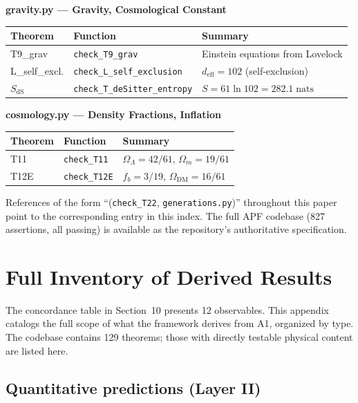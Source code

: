 \documentclass[11pt]{article}
\newcommand{\nats}{\;\mathrm{nats}}
\begin{document}
\medskip
\noindent\textbf{gravity.py --- Gravity, Cosmological Constant}

\smallskip
\begin{center}
\small
\begin{tabular}{lll}
\toprule
\textbf{Theorem} & \textbf{Function} & \textbf{Summary} \\
\midrule
T9\_grav & \texttt{check\_T9\_grav} & Einstein equations from Lovelock \\
L\_self\_excl. & \texttt{check\_L\_self\_exclusion} & $d_{\mathrm{eff}} = 102$ (self-exclusion) \\
$S_{\mathrm{dS}}$ & \texttt{check\_T\_deSitter\_entropy} & $S = 61\ln 102 = 282.1\nats$ \\
\bottomrule
\end{tabular}
\end{center}

\medskip
\noindent\textbf{cosmology.py --- Density Fractions, Inflation}

\smallskip
\begin{center}
\small
\begin{tabular}{lll}
\toprule
\textbf{Theorem} & \textbf{Function} & \textbf{Summary} \\
\midrule
T11 & \texttt{check\_T11} & $\Omega_\Lambda = 42/61$, $\Omega_m = 19/61$ \\
T12E & \texttt{check\_T12E} & $f_b = 3/19$, $\Omega_{\mathrm{DM}} = 16/61$ \\
\bottomrule
\end{tabular}
\end{center}

\medskip
References of the form ``(\texttt{check\_T22}, \texttt{generations.py})'' throughout this paper point to the corresponding entry in this index.  The full APF codebase (827 assertions, all passing) is available as the repository's authoritative specification.


\section{Full Inventory of Derived Results}

The concordance table in Section~10 presents 12 observables.  This appendix catalogs the full scope of what the framework derives from A1, organized by type.  The codebase contains 129 theorems; those with directly testable physical content are listed here.

\subsection{Quantitative predictions (Layer II)}
\end{document}
